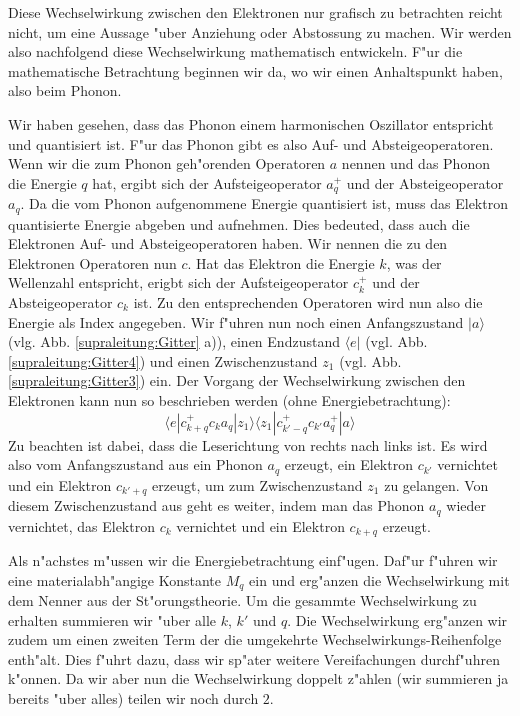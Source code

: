 \begin{refsection}
Diese Wechselwirkung zwischen den Elektronen nur grafisch zu betrachten reicht nicht,
um eine Aussage "uber Anziehung oder Abstossung zu machen.
Wir werden also nachfolgend diese Wechselwirkung mathematisch entwickeln.
F"ur die mathematische Betrachtung beginnen wir da, wo wir einen Anhaltspunkt haben, also beim Phonon.

Wir haben gesehen, dass das Phonon einem harmonischen Oszillator entspricht und quantisiert ist.
F"ur das Phonon gibt es also Auf- und Absteigeoperatoren.
Wenn wir die zum Phonon geh"orenden Operatoren $a$ nennen und das Phonon die Energie $q$ hat,
ergibt sich der Aufsteigeoperator
$a^+_q$ und der Absteigeoperator $a_q$.
Da die vom Phonon aufgenommene Energie quantisiert ist, muss das Elektron quantisierte Energie
abgeben und aufnehmen.
Dies bedeuted, dass auch die Elektronen Auf- und Absteigeoperatoren haben.
Wir nennen die zu den Elektronen Operatoren nun $c$. Hat das Elektron die Energie $k$, %
was der Wellenzahl entspricht, erigbt sich der Aufsteigeoperator $c^+_k$ und der
Absteigeoperator $c_k$ ist.
Zu den entsprechenden Operatoren wird nun also die Energie als Index angegeben.
Wir f"uhren nun noch einen Anfangszustand $|a\rangle$ (vlg. Abb. \ref{supraleitung:Gitter} a)),
einen Endzustand $\langle e|$ (vgl. Abb. \ref{supraleitung:Gitter4}) und
einen Zwischenzustand $z_1$ (vgl. Abb. \ref{supraleitung:Gitter3}) ein.
Der Vorgang der Wechselwirkung zwischen den Elektronen kann nun so beschrieben werden
(ohne Energiebetrachtung):
\begin{equation}
\langle e|c^+_{k+q} c_k a_q |z_1\rangle\langle z_1| c^+_{k'-q} c_{k'} a^+_q |a\rangle
\label{supraleitung:WechelwirkungOE}
\end{equation}
Zu beachten ist dabei, dass die Leserichtung von rechts nach links ist.
Es wird also vom Anfangszustand aus ein Phonon $a_q$ erzeugt, ein Elektron $c_{k'}$ vernichtet
und ein Elektron $c_{k'+q}$ erzeugt, um zum Zwischenzustand $z_1$ zu gelangen.
Von diesem Zwischenzustand aus geht es weiter, indem man das Phonon $a_q$ wieder vernichtet,
das Elektron $c_k$ vernichtet und ein Elektron $c_{k+q}$ erzeugt.

Als n"achstes m"ussen wir die Energiebetrachtung einf"ugen.
Daf"ur f"uhren wir eine materialabh"angige Konstante $M_q$ ein und erg"anzen die
Wechselwirkung mit dem Nenner aus der St"orungstheorie.
Um die gesammte Wechselwirkung zu erhalten summieren wir "uber alle $k$, $k'$ und $q$.
Die Wechselwirkung erg"anzen wir zudem um einen zweiten Term der die umgekehrte
Wechselwirkungs-Reihenfolge enth"alt.
Dies f"uhrt dazu, dass wir sp"ater weitere Vereifachungen durchf"uhren k"onnen.
Da wir aber nun die Wechselwirkung doppelt z"ahlen (wir summieren ja bereits "uber alles)
teilen wir noch durch $2$.


\end{refsection}
